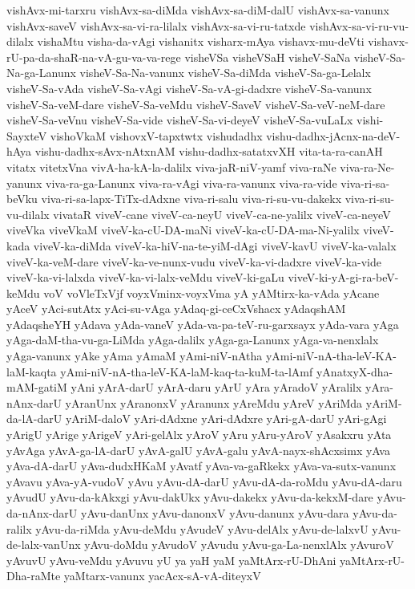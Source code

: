 {vishAvx-mi-tarxru
vishAvx-sa-diMda
vishAvx-sa-diM-dalU
vishAvx-sa-vanunx
vishAvx-saveV
vishAvx-sa-vi-ra-lilalx
vishAvx-sa-vi-ru-tatxde
vishAvx-sa-vi-ru-vu-dilalx
vishaMtu
visha-da-vAgi
vishanitx
visharx-mAya
vishavx-mu-deVti
vishavx-rU-pa-da-shaR-na-vA-gu-va-va-rege
visheVSa
visheVSaH
visheV-SaNa
visheV-Sa-Na-ga-Lanunx
visheV-Sa-Na-vanunx
visheV-Sa-diMda
visheV-Sa-ga-Lelalx
visheV-Sa-vAda
visheV-Sa-vAgi
visheV-Sa-vA-gi-dadxre
visheV-Sa-vanunx
visheV-Sa-veM-dare
visheV-Sa-veMdu
visheV-SaveV
visheV-Sa-veV-neM-dare
visheV-Sa-veVnu
visheV-Sa-vide
visheV-Sa-vi-deyeV
visheV-Sa-vuLaLx
vishi-SayxteV
vishoVkaM
vishovxV-tapxtwtx
vishudadhx
vishu-dadhx-jAcnx-na-deV-hAya
vishu-dadhx-sAvx-nAtxnAM
vishu-dadhx-satatxvXH
vita-ta-ra-canAH
vitatx
vitetxVna
vivA-ha-kA-la-dalilx
viva-jaR-niV-yamf
viva-raNe
viva-ra-Ne-yanunx
viva-ra-ga-Lanunx
viva-ra-vAgi
viva-ra-vanunx
viva-ra-vide
viva-ri-sa-beVku
viva-ri-sa-lapx-TiTx-dAdxne
viva-ri-salu
viva-ri-su-vu-dakekx
viva-ri-su-vu-dilalx
vivataR
viveV-cane
viveV-ca-neyU
viveV-ca-ne-yalilx
viveV-ca-neyeV
viveVka
viveVkaM
viveV-ka-cU-DA-maNi
viveV-ka-cU-DA-ma-Ni-yalilx
viveV-kada
viveV-ka-diMda
viveV-ka-hiV-na-te-yiM-dAgi
viveV-kavU
viveV-ka-valalx
viveV-ka-veM-dare
viveV-ka-ve-nunx-vudu
viveV-ka-vi-dadxre
viveV-ka-vide
viveV-ka-vi-lalxda
viveV-ka-vi-lalx-veMdu
viveV-ki-gaLu
viveV-ki-yA-gi-ra-beV-keMdu
voV
voVleTxVjf
voyxVminx-voyxVma
yA
yAMtirx-ka-vAda
yAcane
yAceV
yAci-sutAtx
yAci-su-vAga
yAdaq-gi-ceCxVshacx
yAdaqshAM
yAdaqsheYH
yAdava
yAda-vaneV
yAda-va-pa-teV-ru-garxsayx
yAda-vara
yAga
yAga-daM-tha-vu-ga-LiMda
yAga-dalilx
yAga-ga-Lanunx
yAga-va-nenxlalx
yAga-vanunx
yAke
yAma
yAmaM
yAmi-niV-nAtha
yAmi-niV-nA-tha-leV-KA-laM-kaqta
yAmi-niV-nA-tha-leV-KA-laM-kaq-ta-kuM-ta-lAmf
yAnatxyX-dha-mAM-gatiM
yAni
yArA-darU
yArA-daru
yArU
yAra
yAradoV
yAralilx
yAra-nAnx-darU
yAranUnx
yAranonxV
yAranunx
yAreMdu
yAreV
yAriMda
yAriM-da-lA-darU
yAriM-daloV
yAri-dAdxne
yAri-dAdxre
yAri-gA-darU
yAri-gAgi
yArigU
yArige
yArigeV
yAri-gelAlx
yAroV
yAru
yAru-yAroV
yAsakxru
yAta
yAvAga
yAvA-ga-lA-darU
yAvA-galU
yAvA-galu
yAvA-nayx-shAcxsimx
yAva
yAva-dA-darU
yAva-dudxHKaM
yAvatf
yAva-va-gaRkekx
yAva-va-sutx-vanunx
yAvavu
yAva-yA-vudoV
yAvu
yAvu-dA-darU
yAvu-dA-da-roMdu
yAvu-dA-daru
yAvudU
yAvu-da-kAkxgi
yAvu-dakUkx
yAvu-dakekx
yAvu-da-kekxM-dare
yAvu-da-nAnx-darU
yAvu-danUnx
yAvu-danonxV
yAvu-danunx
yAvu-dara
yAvu-da-ralilx
yAvu-da-riMda
yAvu-deMdu
yAvudeV
yAvu-delAlx
yAvu-de-lalxvU
yAvu-de-lalx-vanUnx
yAvu-doMdu
yAvudoV
yAvudu
yAvu-ga-La-nenxlAlx
yAvuroV
yAvuvU
yAvu-veMdu
yAvuvu
yU
ya
yaH
yaM
yaMtArx-rU-DhAni
yaMtArx-rU-Dha-raMte
yaMtarx-vanunx
yacAcx-sA-vA-diteyxV
}
